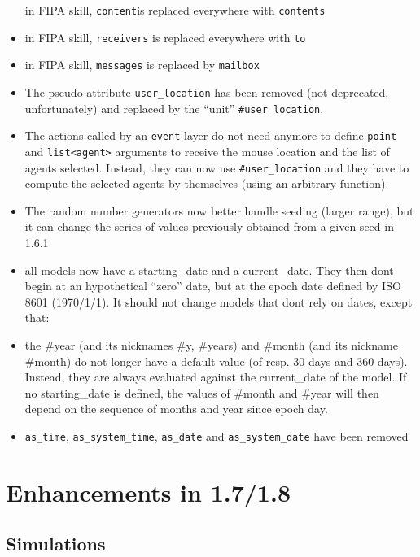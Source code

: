 \documentclass[]{book}
\theoremstyle{definition}
\theoremstyle{definition}
\theoremstyle{definition}
\theoremstyle{remark}
\begin{document}
\begin{itemize}
  in FIPA skill, \texttt{content}is replaced everywhere with
  \texttt{contents}
\item
  in FIPA skill, \texttt{receivers} is replaced everywhere with
  \texttt{to}
\item
  in FIPA skill, \texttt{messages} is replaced by \texttt{mailbox}
\item
  The pseudo-attribute \texttt{user\_location} has been removed (not
  deprecated, unfortunately) and replaced by the ``unit''
  \texttt{\#user\_location}.
\item
  The actions called by an \texttt{event} layer do not need anymore to
  define \texttt{point} and \texttt{list\textless{}agent\textgreater{}}
  arguments to receive the mouse location and the list of agents
  selected. Instead, they can now use \texttt{\#user\_location} and they
  have to compute the selected agents by themselves (using an arbitrary
  function).
\item
  The random number generators now better handle seeding (larger range),
  but it can change the series of values previously obtained from a
  given seed in 1.6.1
\item
  all models now have a starting\_date and a current\_date. They then
  dont begin at an hypothetical ``zero'' date, but at the epoch date
  defined by ISO 8601 (1970/1/1). It should not change models that dont
  rely on dates, except that:
\item
  the \#year (and its nicknames \#y, \#years) and \#month (and its
  nickname \#month) do not longer have a default value (of resp. 30 days
  and 360 days). Instead, they are always evaluated against the
  current\_date of the model. If no starting\_date is defined, the
  values of \#month and \#year will then depend on the sequence of
  months and year since epoch day.
\item
  \texttt{as\_time}, \texttt{as\_system\_time}, \texttt{as\_date} and
  \texttt{as\_system\_date} have been removed
\end{itemize}

\chapter{Enhancements in 1.7/1.8}\label{enhancements-in-1.71.8}

\section{Simulations}\label{simulations}
\end{document}

